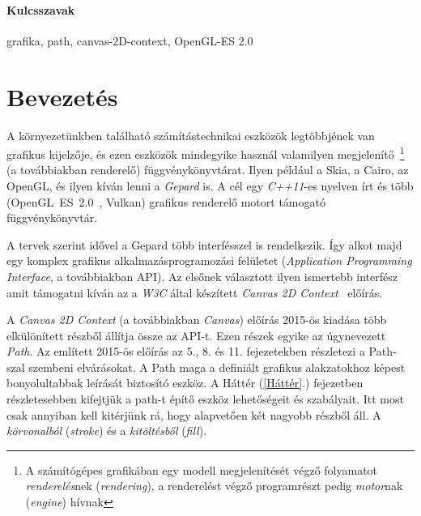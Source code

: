 \documentclass[12pt]{report}
\theoremstyle{definition}
\newcommand{\inenglish}[1]{\textsl{#1}}
\newcommand{\inenglishfn}[1]{\footnotesize{\inenglish{#1}}}
\begin{document}
    \subsubsection*{Kulcsszavak}

grafika, path, canvas-2D-context, OpenGL-ES 2.0



    \chapter*{Bevezetés}
    \label{Bevezetés}

  A környezetünkben található számítástechnikai eszközök
legtöbbjének van grafikus kijelzője, és ezen eszközök mindegyike használ
valamilyen megjelenítő~\footnote{A számítógépes grafikában egy modell
megjelenítését végző folyamatot \emph{renderelés}nek (\inenglishfn{rendering}),
a renderelést végző programrészt pedig \emph{motor}nak (\inenglishfn{engine})
hívnak} (a továbbiakban renderelő) függvénykönyvtárat. Ilyen például a Skia, a
Cairo, az OpenGL, és ilyen kíván lenni a \emph{Gepard} is. A cél egy
\emph{C++11}-es nyelven írt és több (\mbox{OpenGL~ES~2.0
\cite{Munshi:2008:OEP:1481069}}, Vulkan) grafikus renderelő motort támogató
függvénykönyvtár.

  A tervek szerint idővel a Gepard több interfésszel is rendelkezik.
Így alkot majd egy komplex grafikus alkalmazásprogramozási felületet
(\inenglish{Application Programming Interface}, a továbbiakban API). Az elsőnek
választott ilyen ismertebb interfész amit támogatni kíván az a \emph{W3C} által
készített \emph{Canvas 2D Context}~\cite{Cabanier:14:HCC} előírás.

  A \emph{Canvas 2D Context} (a továbbiakban \emph{Canvas}) előírás
2015-ös kiadása több elkülönített részből állítja össze az API-t. Ezen részek
egyike az úgynevezett \emph{Path}. Az említett 2015-ös előírás az 5., 8. és 11.
fejezetekben részletezi a Path-szal szembeni elvárásokat. A Path maga a
definiált grafikus alakzatokhoz képest bonyolultabbak leírását biztosító
eszköz. A Háttér (\ref{Háttér}.) fejezetben részletesebben kifejtjük a path-t
építő eszköz lehetőségeit és szabályait. Itt most csak annyiban kell kitérjünk
rá, hogy alapvetően két nagyobb részből áll. A \emph{körvonalból}
(\inenglish{stroke}) és a \emph{kitöltésből} (\inenglish{fill}).
\end{document}
